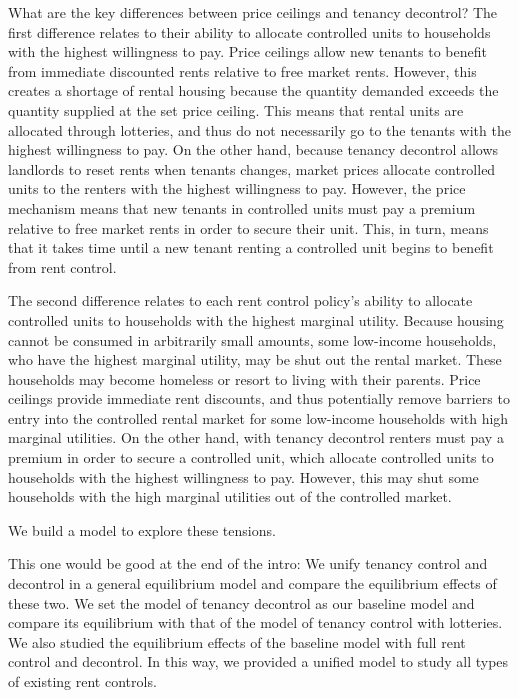 \documentclass[parskip=full]{article}
\begin{document}
What are the key differences between price ceilings and tenancy decontrol? The first difference relates to their ability to allocate controlled units to households with the highest willingness to pay. Price ceilings allow new tenants to benefit from immediate discounted rents relative to free market rents. However, this creates a shortage of rental housing because the quantity demanded exceeds the quantity supplied at the set price ceiling. This means that rental units are allocated through lotteries, and thus do not necessarily go to the tenants with the highest willingness to pay. On the other hand, because tenancy decontrol allows landlords to reset rents when tenants changes, market prices allocate controlled units to the renters with the highest willingness to pay. However, the price mechanism means that new tenants in controlled units must pay a premium relative to free market rents in order to secure their unit. This, in turn, means that it takes time until a new tenant renting a controlled unit begins to benefit from rent control.

The second difference relates to each rent control policy's ability to allocate controlled units to households with the highest marginal utility. Because housing cannot be consumed in arbitrarily small amounts, some low-income households, who have the highest marginal utility, may be shut out the rental market. These households may become homeless or resort to living with their parents. Price ceilings provide immediate rent discounts, and thus potentially remove barriers to entry into the controlled rental market for some low-income households with high marginal utilities. On the other hand, with tenancy decontrol renters must pay a premium in order to secure a controlled unit, which allocate controlled units to households with the highest willingness to pay. However, this may shut some households with the high marginal utilities out of the controlled market.  

We build a model to explore these tensions. 

This one would be good at the end of the intro: We unify tenancy control and decontrol in a general equilibrium model and compare the equilibrium effects of these two. We set the model of tenancy decontrol as our baseline model and compare its equilibrium with that of the model of tenancy control with lotteries. We also studied the equilibrium effects of the baseline model with full rent control and decontrol. In this way, we provided a unified model to study all types of existing rent controls. 
\end{document}
